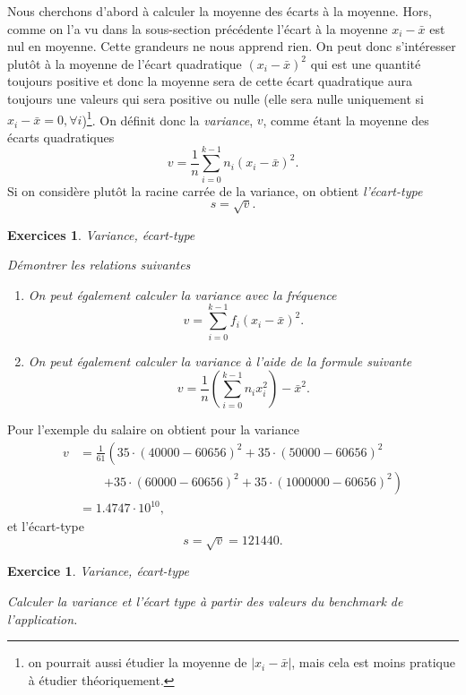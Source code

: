 \documentclass[a4paper,12pt]{book}
\newtheorem*{exercice}{Exercice}
\newtheorem*{exercices}{Exercices}
\begin{document}
Nous cherchons d'abord à calculer la moyenne des écarts à la moyenne. 
Hors, comme on l'a vu dans la sous-section précédente l'écart à la moyenne $x_i-\bar{x}$ est nul en moyenne. Cette grandeurs ne nous apprend rien. 
On peut donc s'intéresser plutôt à la moyenne de l'écart quadratique $(x_i-\bar{x})^2$ qui est une quantité toujours positive et donc la moyenne sera 
de cette écart quadratique aura toujours une valeurs qui sera positive ou nulle (elle sera nulle uniquement si 
$x_i-\bar{x}=0,\forall i$)\footnote{on pourrait aussi étudier la moyenne de $|x_i-\bar{x}|$, mais cela est moins pratique à étudier théoriquement.}.
On définit donc la \textit{variance}, $v$, comme étant la moyenne des écarts quadratiques
\begin{equation}
 v=\frac{1}{n}\sum_{i=0}^{k-1}n_i(x_i-\bar{x})^2.
\end{equation}
Si on considère plutôt la racine carrée de la variance, on obtient \textit{l'écart-type}
\begin{equation}
 s=\sqrt{v}.
\end{equation}
\begin{exercices}{Variance, écart-type}

Démontrer les relations suivantes
 \begin{enumerate}
  \item On peut également calculer la variance avec la fréquence
  \begin{equation}
   v=\sum_{i=0}^{k-1}f_i(x_i-\bar{x})^2.
  \end{equation}
  \item On peut également calculer la variance à l'aide de la formule suivante
  \begin{equation}
   v=\frac{1}{n}\left(\sum_{i=0}^{k-1}n_ix_i^2\right)-\bar{x}^2.
  \end{equation}
 \end{enumerate}
\end{exercices}
Pour l'exemple du salaire on obtient pour la variance
\begin{align}
 v&=\frac{1}{61}\left(35\cdot(40000-60656)^2+35\cdot(50000-60656)^2\right.\nonumber\\
 &\quad\quad\left.+35\cdot(60000-60656)^2+35\cdot(1000000-60656)^2\right)\nonumber\\
 &=1.4747\cdot 10^{10},
\end{align}
et l'écart-type
\begin{equation}
 s=\sqrt{v}=121440.
\end{equation}
\begin{exercice}{Variance, écart-type}

Calculer la variance et l'écart type à partir des valeurs du benchmark de l'application.
\end{exercice}
\end{document}
